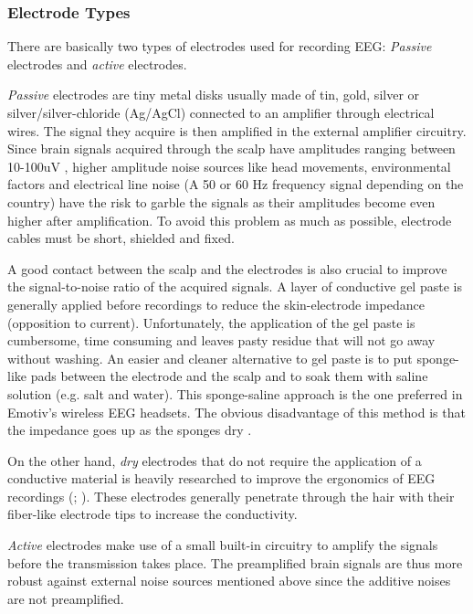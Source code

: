 \documentclass[12pt]{article}
\newcommand\mysubsubsection[1]{\subsubsection{#1}}
\numberwithin{equation}{section}
\numberwithin{figure}{section}
\numberwithin{table}{section}
\begin{document}
\mysubsubsection{Electrode Types}
\par{
    There are basically two types of electrodes used for recording EEG: \emph{Passive} electrodes and
    \emph{active} electrodes.
}
\par{
    \emph{Passive} electrodes are tiny metal disks usually made of tin, gold, silver
    or silver/silver-chloride (Ag/AgCl) connected to an amplifier
    through electrical wires. The signal they acquire is then amplified in the
    external amplifier circuitry. Since brain signals acquired through the scalp
    have amplitudes ranging between 10-100uV \citep{sanei_eeg_2008}, higher amplitude noise sources like
    head movements, environmental factors and electrical line noise (A 50 or 60 Hz
    frequency signal depending on the country) have the risk to garble the signals as their
    amplitudes become even higher after amplification. To avoid this problem as much as
    possible, electrode cables must be short, shielded and fixed.
}
\par{
    A good contact between the scalp and the electrodes is also crucial to
    improve the signal-to-noise ratio of the acquired signals. A layer of conductive
    gel paste is generally applied before recordings to reduce the skin-electrode impedance (opposition to current).
    Unfortunately, the application of the gel paste is cumbersome, time consuming and
    leaves pasty residue that will not go away without washing. An easier and
    cleaner alternative to gel paste is to put sponge-like pads between the
    electrode and the scalp and to soak them with saline solution (e.g. salt and water).
    This sponge-saline approach is the one preferred in Emotiv's wireless
    EEG headsets. The obvious disadvantage of this method is that the impedance
    goes up as the sponges dry \citep{wolpaw_brain-computer_2012}.
}
\par{
    On the other hand, \emph{dry} electrodes
    that do not require the application of a conductive material is heavily
    researched to improve the ergonomics of EEG recordings (\citealp{popescu_single_2007}; \citealp{grozea_bristle-sensorslow-cost_2011}).
    These electrodes generally penetrate through the hair
    with their fiber-like electrode tips to increase the conductivity.
}
\par{
    \emph{Active} electrodes make use of a small built-in circuitry to amplify
    the signals before the transmission takes place. The preamplified brain signals
    are thus more robust against external noise sources mentioned above since
    the additive noises are not preamplified.
}
\end{document}
